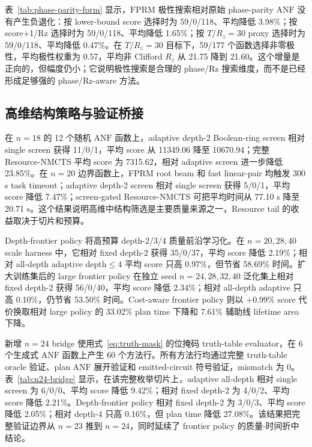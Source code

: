 \documentclass[UTF8,fontset=macnew,11pt]{ctexart}
\newcommand{\method}{Resource-NMCTS}
\newcommand{\anf}{\ensuremath{\mathrm{ANF}}}
\newcommand{\fprm}{\ensuremath{\mathrm{FPRM}}}
\newcommand{\rz}{\ensuremath{R_z}}
\newcommand{\ttable}{truth-table}
\begin{document}
\begin{table}[H]
\centering
\small
\caption{Fixed-polarity phase-parity search。每个函数枚举全部 $2^n$ 个极性，按 lower-bound score、score+1/Rz 和 $T/R_z=30$ proxy 三个目标分别选择最优极性；共 531 行全部 up-to-global-phase 验证通过。}
\label{tab:phase-parity-fprm}

\end{table}

表~\ref{tab:phase-parity-fprm} 显示，\fprm{} 极性搜索相对原始 phase-parity \anf{} 没有产生负退化：按 lower-bound score 选择时为 59/0/118、平均降低 3.98\%；按 score+1/Rz 选择时为 59/0/118、平均降低 1.65\%；按 $T/R_z=30$ proxy 选择时为 59/0/118、平均降低 0.47\%。在 $T/R_z=30$ 目标下，59/177 个函数选择非零极性，平均极性权重为 0.57，平均非 Clifford \rz{} 从 21.75 降到 21.60。这个增量是正向的，但幅度仍小；它说明极性搜索是合理的 phase/Rz 搜索维度，而不是已经形成足够强的 phase/Rz-aware 方法。

\subsection{高维结构策略与验证桥接}

在 $n=18$ 的 12 个随机 \anf{} 函数上，adaptive depth-2 Boolean-ring screen 相对 single screen 获得 11/0/1，平均 score 从 11349.06 降至 10670.94；完整 \method{} 平均 score 为 7315.62，相对 adaptive screen 进一步降低 23.85\%。在 $n=20$ 边界函数上，FPRM root beam 和 fast linear-pair 均触发 300 s task timeout；adaptive depth-2 screen 相对 single screen 获得 5/0/1，平均 score 降低 7.47\%；screen-gated \method{} 可把平均时间从 77.10 s 降至 20.71 s。这个结果说明高维中结构筛选是主要质量来源之一，Resource tail 的收益取决于切片和预算。

Depth-frontier policy 将高预算 depth-2/3/4 质量前沿学习化。在 $n=20,28,40$ scale harness 中，它相对 fixed depth-2 获得 35/0/37，平均 score 降低 2.19\%；相对 all-depth adaptive depth$\leq4$ 平均 score 只高 0.97\%，但节省 58.69\% 时间。扩大训练集后的 large frontier policy 在独立 seed $n=24,28,32,40$ 泛化集上相对 fixed depth-2 获得 56/0/40，平均 score 降低 2.34\%；相对 all-depth adaptive 只高 0.10\%，仍节省 53.50\% 时间。Cost-aware frontier policy 则以 +0.99\% score 代价换取相对 large policy 的 33.02\% plan time 下降和 7.61\% 辅助线 lifetime area 下降。

新增 $n=24$ bridge 使用式~\eqref{eq:truth-mask} 的位掩码 truth-table evaluator，在 6 个生成式 \anf{} 函数上产生 60 个方法行。所有方法行均通过完整 \ttable{} oracle 验证、plan \anf{} 展开验证和 emitted-circuit 符号验证，mismatch 为 0。表~\ref{tab:n24-bridge} 显示，在该完整枚举切片上，adaptive all-depth 相对 single screen 为 6/0/0、平均 score 降低 9.42\%；相对 fixed depth-2 为 4/0/2、平均 score 降低 2.21\%。Depth-frontier policy 相对 fixed depth-2 为 3/0/3、平均 score 降低 2.05\%；相对 depth-4 只高 0.16\%，但 plan time 降低 27.08\%。该结果把完整验证边界从 $n=23$ 推到 $n=24$，同时延续了 frontier policy 的质量-时间折中结论。
\end{document}
